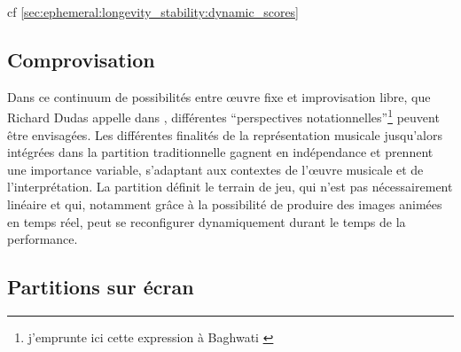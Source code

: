 cf \ref{sec:ephemeral:longevity_stability:dynamic_scores}


\subsection{Comprovisation}

\indent Dans ce continuum de possibilités entre œuvre fixe et improvisation libre, que Richard Dudas appelle  dans \cite{dudas_comprovisation:_2010}, différentes ``perspectives notationnelles''\footnote{j'emprunte ici cette expression à Baghwati \cite{bhagwati_notational_2013}} peuvent être envisagées. Les différentes finalités de la représentation musicale jusqu'alors intégrées dans la partition traditionnelle gagnent en indépendance et prennent une importance variable, s'adaptant aux contextes de l'œuvre musicale et de l'interprétation. La partition définit le terrain de jeu, qui n'est pas nécessairement linéaire et qui, notamment grâce à la possibilité de produire des images animées en temps réel, peut se reconfigurer dynamiquement durant le temps de la performance.


\subsection{Partitions sur écran}

